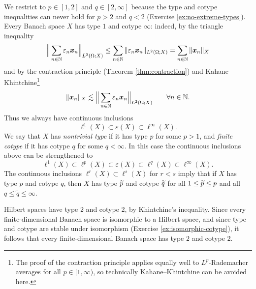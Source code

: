 We restrict to $p \in [1,2]$ and $q \in [2,\infty]$ because the type and cotype inequalities can never hold for $p > 2$ and $q < 2$ (Exercise \ref{ex:no-extreme-types}).
Every Banach space $X$ has type $1$ and cotype $\infty$: indeed, by the triangle inequality
\begin{equation*}
  \Big\| \sum_{n \in \mathbb{N}} \varepsilon_{n} \bm{x}_{n} \Big\|_{L^2(\Omega;X)} \leq \sum_{n \in \mathbb{N}} \|\varepsilon_{n} \bm{x}_{n}\|_{L^2(\Omega;X)} = \sum_{n \in \mathbb{N}} \|\bm{x}_{n}\|_{X}
\end{equation*}
and by the contraction principle (Theorem \ref{thm:contraction}) and Kahane--Khintchine\footnote{The proof of the contraction principle applies equally well to $L^p$-Rademacher averages for all $p \in [1,\infty)$, so technically Kahane--Khintchine can be avoided here.}
\begin{equation*}
  \|\bm{x}_{n}\|_{X} \lesssim \Big\| \sum_{n \in \mathbb{N}} \varepsilon_{n} \bm{x}_{n}\Big\|_{L^2(\Omega;X)} \qquad \forall n \in \mathbb{N}.
\end{equation*}
Thus we always have continuous inclusions
\begin{equation*}
  \ell^1(X)\subset  \varepsilon(X) \subset \ell^{\infty}(X).
\end{equation*}
We say that $X$ has \emph{nontrivial type} if it has type $p$ for some $p > 1$, and \emph{finite cotype} if it has cotype $q$ for some $q < \infty$.
In this case the continuous inclusions above can be strengthened to
\begin{equation*}
  \ell^1(X)\subset \ell^p(X) \subset \varepsilon(X) \subset \ell^{q}(X) \subset \ell^{\infty}(X).
\end{equation*}
The continuous inclusions $\ell^{r}(X) \subset \ell^{s}(X)$ for $r < s$ imply that if $X$ has type $p$ and cotype $q$, then $X$ has type $\widetilde{p}$ and cotype $\widetilde{q}$ for all $1 \leq \widetilde{p} \leq p$ and all $q \leq \tilde{q} \leq \infty$.

Hilbert spaces have type $2$ and cotype $2$, by Khintchine's inequality.
Since every finite-dimensional Banach space is isomorphic to a Hilbert space, and since type and cotype are stable under isomorphism (Exercise \ref{ex:isomorphic-cotype}), it follows that every finite-dimensional Banach space has type $2$ and cotype $2$.


